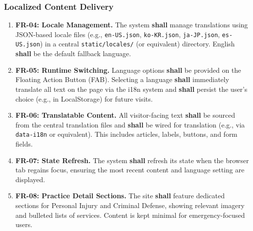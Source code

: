 \documentclass{article}
\begin{document}
\subsubsection{Localized Content Delivery}
\begin{enumerate}
  \item \textbf{FR-04: Locale Management.} The system \textbf{shall} manage translations using JSON-based locale files (e.g., \texttt{en-US.json}, \texttt{ko-KR.json}, \texttt{ja-JP.json}, \texttt{es-US.json}) in a central \texttt{static/locales/} (or equivalent) directory. English \textbf{shall} be the default fallback language.
  \item \textbf{FR-05: Runtime Switching.} Language options \textbf{shall} be provided on the Floating Action Button (FAB). Selecting a language \textbf{shall} immediately translate all text on the page via the i18n system and \textbf{shall} persist the user's choice (e.g., in LocalStorage) for future visits.
  \item \textbf{FR-06: Translatable Content.} All visitor-facing text \textbf{shall} be sourced from the central translation files and \textbf{shall} be wired for translation (e.g., via \texttt{data-i18n} or equivalent). This includes articles, labels, buttons, and form fields.
  \item \textbf{FR-07: State Refresh.} The system \textbf{shall} refresh its state when the browser tab regains focus, ensuring the most recent content and language setting are displayed.
  \item \label{fr:08} \textbf{FR-08: Practice Detail Sections.} The site \textbf{shall} feature dedicated sections for Personal Injury and Criminal Defense, showing relevant imagery and bulleted lists of services. Content is kept minimal for emergency-focused users.
\end{enumerate}
\end{document}

